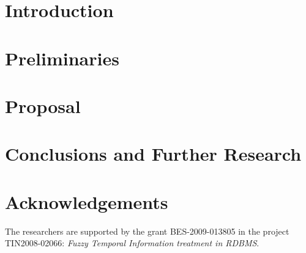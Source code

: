 \documentclass{llncs}
\begin{document}
%
\section{Introduction}
\label{sec:Introduction}

%

\section{Preliminaries}
\label{sec:preliminaries}




\section{Proposal}
\label{sec:proposal}



%
%
%
\section{Conclusions and Further Research}
\label{sec:futher-research}

%




%
\section*{Acknowledgements}
%
The researchers are supported by the grant BES-2009-013805 in the project TIN2008-02066: \emph{Fuzzy Temporal Information treatment in RDBMS}.




\end{document}
